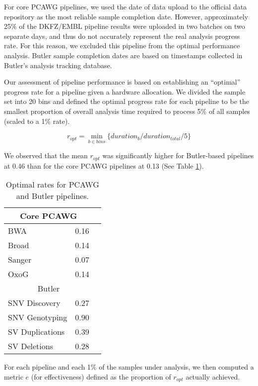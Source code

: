 For core PCAWG pipelines, we used the date of data upload to the official data repository as the most reliable sample completion date. However, approximately 25\% of the DKFZ/EMBL pipeline results were uploaded in two batches on two separate days, and thus do not accurately represent the real analysis progress rate. For this reason, we excluded this pipeline from the optimal performance analysis. Butler sample completion dates are based on timestamps collected in Butler’s analysis tracking database.

Our assessment of pipeline performance is based on establishing an “optimal” progress rate for a pipeline given a hardware allocation. We divided the sample set into 20 bins and defined the optimal progress rate for each pipeline to be the smallest proportion of overall analysis time required to process 5\% of all samples (scaled to a 1\% rate).

\begin{equation}
	r_{opt} = \min_{b \in bins}\{duration_b/duration_{total}/5\}
\end{equation}


We observed that the mean $r_{opt}$  was significantly higher for Butler-based pipelines at 0.46 than for the core PCAWG pipelines at 0.13 (See Table \ref{tab:pipeline_optimal_rates}). 

\begin{table}[H]
	\renewcommand{\arraystretch}{1.2} 
	\centering
	\begin{tabular}{@{}lll@{}}
	\toprule
	\multicolumn{2}{c}{Core PCAWG} \\
	\midrule
	BWA & 0.16\\
	Broad & 0.14\\
	Sanger & 0.07\\
	OxoG & 0.14\\
	\midrule
	\multicolumn{2}{c}{Butler} \\
	\midrule
	SNV Discovery & 0.27\\
	SNV Genotyping & 0.90\\
	SV Duplications & 0.39\\
	SV Deletions & 0.28\\
	\bottomrule
	\end{tabular}
	\caption{Optimal rates for PCAWG and Butler pipelines.}
	\label{tab:pipeline_optimal_rates}
	\end{table}

For each pipeline and each 1\% of the samples under analysis, we then computed a metric $e$ (for effectiveness) defined as the proportion of $r_{opt}$ actually achieved.

